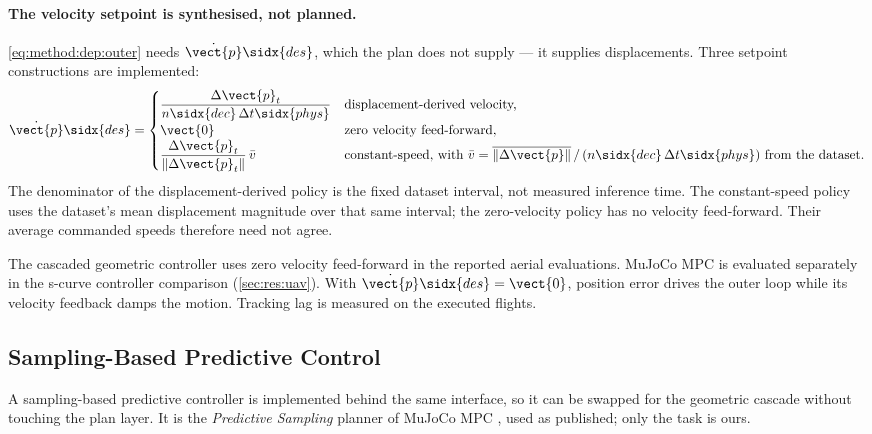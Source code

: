 \paragraph{The velocity setpoint is synthesised, not planned.} \eqref{eq:method:dep:outer} needs
$\dot{\vect{p}}\sidx{des}$, which the plan does not supply --- it supplies displacements. Three
setpoint constructions are implemented:
\begin{equation}\label{eq:method:dep:vdes}
  \dot{\vect{p}}\sidx{des} =
  \begin{cases}
    \dfrac{\Delta\vect{p}_{t}}{n\sidx{dec}\,\Delta t\sidx{phys}} & \text{displacement-derived velocity,}\\
    \vect{0} & \text{zero velocity feed-forward,}\\
    \dfrac{\Delta\vect{p}_{t}}{\|\Delta\vect{p}_{t}\|}\,\bar{v} & \text{constant-speed, with }
      \bar{v} = \overline{\|\Delta\vect{p}\|}\,/\,(n\sidx{dec}\,\Delta t\sidx{phys})\text{ from the dataset.}
  \end{cases}
\end{equation}
The denominator of the displacement-derived policy is the fixed dataset interval, not measured
inference time. The constant-speed policy uses the dataset's mean displacement magnitude over that
same interval; the zero-velocity policy has no velocity feed-forward. Their average commanded
speeds therefore need not agree.

The cascaded geometric controller uses zero velocity feed-forward in the reported aerial evaluations.
MuJoCo MPC is evaluated separately in the s-curve controller comparison
(\autoref{sec:res:uav}). With $\dot{\vect{p}}\sidx{des}=\vect{0}$, position error drives the outer
loop while its velocity feedback damps the motion. Tracking lag is measured on the executed flights.

\subsection{Sampling-Based Predictive Control}\label{sec:method:mjpc}

A sampling-based predictive controller is
implemented behind the same interface, so it can be swapped for the geometric cascade without
touching the plan layer. It is the \emph{Predictive Sampling} planner of MuJoCo MPC \parencite{howell2022predictive}, used
as published; only the task is ours.

